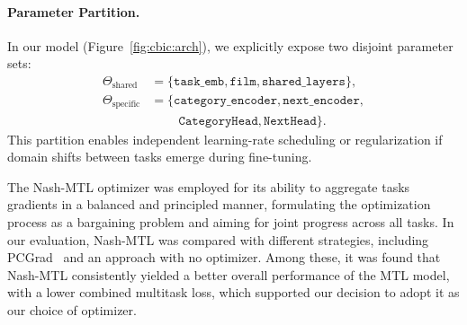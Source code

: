 \paragraph*{Parameter Partition.}
In our model (Figure~\ref{fig:cbic:arch}), we explicitly expose two disjoint parameter sets:
\[
  \begin{aligned}
    \Theta_{\text{shared}}   &= \{\texttt{task\_emb},\texttt{film},\texttt{shared\_layers}\},\\
    \Theta_{\text{specific}} &= \{\texttt{category\_encoder},\texttt{next\_encoder},\\
                             &\qquad\ \texttt{CategoryHead},\texttt{NextHead}\}.
  \end{aligned}
\]
This partition enables independent learning-rate scheduling or regularization if domain shifts between tasks emerge during fine-tuning.

The Nash-MTL optimizer was employed for its ability to aggregate tasks gradients in a balanced and principled manner, formulating the optimization process as a bargaining problem and aiming for joint progress across all tasks. In our evaluation, Nash-MTL was compared with different strategies, including PCGrad~\cite{yu2020pcgrad} and an approach with no optimizer. Among these, it was found that Nash-MTL consistently yielded a better overall performance of the MTL model, with a lower combined multitask loss, which supported our decision to adopt it as our choice of optimizer.
